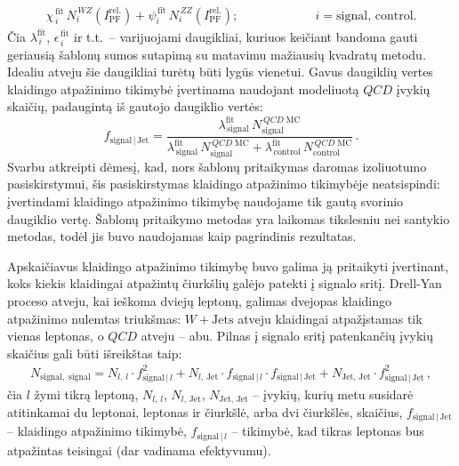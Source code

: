 \documentclass[a4paper, 12pt, oneside]{article}
\newcommand{\ZZ}{Z\! Z}
\newcommand{\WZ}{W\! Z}
\newcommand{\WJets}{W\! +\!\mathrm{Jets}}
\newcommand{\QCD}{QC\! D}
\newlength\q
\begin{document}
\begin{enumerate}
\begin{equation}
\begin{gathered}
			\chi^{\,\mathrm{fit}}_{\,i}\, N^{\,\WZ}_{i}(I^{\mathrm{rel.}}_{\mathrm{PF}}) +
			\psi^{\,\mathrm{fit}}_{i}\, N^{\,\ZZ}_{i}(I^{\mathrm{rel.}}_{\mathrm{PF}});
			\hspace{74pt} i = \mathrm{signal}, \, \mathrm{control}.
		\end{gathered}
	\end{equation}
	Čia $\lambda^{\mathrm{fit}}_{\,i}$, $\epsilon^{\,\mathrm{fit}}_{\,i}$ ir t.t.\ -- varijuojami daugikliai,
	kuriuos keičiant bandoma gauti geriausią šablonų sumos sutapimą su matavimu mažiausių kvadratų metodu.
	Idealiu atveju šie daugikliai turėtų būti lygūs vienetui. 
	Gavus daugiklių vertes klaidingo atpažinimo tikimybė įvertinama naudojant modeliuotą $\QCD$ įvykių skaičių, padaugintą
	iš gautojo daugiklio vertės:
	\begin{equation}
		f_{\mathrm{signal} \,| \,\mathrm{Jet}} =
		\frac{\lambda^{\mathrm{fit}}_{\,\mathrm{signal}}\, N^{\,\QCD \; \mathrm{MC}}_{\mathrm{signal}}}
		{\lambda^{\mathrm{fit}}_{\,\mathrm{signal}}\, N^{\,\QCD \; \mathrm{MC}}_{\mathrm{signal}} +
		\lambda^{\mathrm{fit}}_{\,\mathrm{control}}\, N^{\,\QCD \; \mathrm{MC}}_{\mathrm{control}}}\, .
	\end{equation}
	Svarbu atkreipti dėmesį, kad, nors šablonų pritaikymas daromas izoliuotumo pasiskirstymui, šis pasiskirstymas klaidingo
	atpažinimo tikimybėje neatsispindi: įvertindami klaidingo atpažinimo tikimybę naudojame tik gautą svorinio daugiklio vertę.
	Šablonų pritaikymo metodas yra laikomas tikslesniu nei santykio metodas, todėl jis buvo naudojamas kaip pagrindinis rezultatas.
\end{enumerate}

Apskaičiavus klaidingo atpažinimo tikimybę buvo galima ją pritaikyti įvertinant, koks kiekis klaidingai atpažintų čiurkšlių
galėjo patekti į signalo sritį.
Drell-Yan proceso atveju, kai ieškoma dviejų leptonų, galimas dvejopas klaidingo atpažinimo nulemtas triukšmas: $\WJets$ atveju
klaidingai atpažįstamas tik vienas leptonas, o $\QCD$ atveju -- abu.
Pilnas į signalo sritį patenkančių įvykių skaičius gali būti išreikštas taip:
\begin{multline}
	\label{eq:realfake}
	N_{\mathrm{signal, \; signal}} = N_{l, \, l} \cdot f^2_{\mathrm{signal} \,| \, l} +
	N_{l, \, \mathrm{Jet}} \cdot f_{\mathrm{signal} \,| \, l} \cdot f_{\mathrm{signal} \,| \,\mathrm{Jet}} +
	N_{\mathrm{Jet, \, Jet}} \cdot f^2_{\mathrm{signal} \,| \,\mathrm{Jet}} \, ,
\end{multline}
čia $l$ žymi tikrą leptoną, $N_{l, \, l}$, $N_{l, \, \mathrm{Jet}}$, $N_{\mathrm{Jet, \, Jet}}$ -- įvykių,
kurių metu susidarė atitinkamai du leptonai, leptonas ir čiurkšlė, arba dvi čiurkšlės, skaičius,
$f_{\mathrm{signal} \,| \,\mathrm{Jet}}$ -- klaidingo atpažinimo tikimybė, $f_{\mathrm{signal} \,| \,l}$ -- tikimybė,
kad tikras leptonas bus atpažintas teisingai (dar vadinama efektyvumu).
\end{document}
